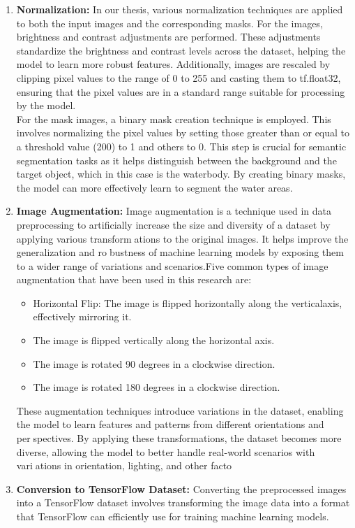 \begin{enumerate}
  
  
  \item \textbf{Normalization: }In our thesis, various normalization techniques are applied to both the input images and the corresponding masks. For the images, brightness and contrast adjustments are performed. These adjustments standardize the brightness and contrast levels across the dataset, helping the model to learn more robust features. Additionally, images are rescaled by clipping pixel values to the range of 0 to 255 and casting them to tf.float32, ensuring that the pixel values are in a standard range suitable for processing by the model.\\
  For the mask images, a binary mask creation technique is employed. This involves normalizing the pixel values by setting those greater than or equal to a threshold value (200) to 1 and others to 0. This step is crucial for semantic segmentation tasks as it helps distinguish between the background and the target object, which in this case is the waterbody. By creating binary masks, the model can more effectively learn to segment the water areas.
  
  \item \textbf{Image Augmentation: }Image augmentation is a technique used in data preprocessing to artificially
increase the size and diversity of a dataset by applying various transformations to the original images. It helps improve the generalization and robustness of machine learning models by exposing them to a wider range of
variations and scenarios.Five common types of image augmentation that
have been used in this research are:
 \begin{itemize}
     \item Horizontal Flip: The image is flipped horizontally along the verticalaxis, effectively mirroring it.
     \item The image is flipped vertically along the horizontal axis.
     \item The image is rotated 90 degrees in a clockwise
direction.
\item The image is rotated 180 degrees in a clockwise
direction.

 \end{itemize}
 These augmentation techniques introduce variations in the dataset, enabling
the model to learn features and patterns from different orientations and perspectives. By applying these transformations, the dataset becomes more
diverse, allowing the model to better handle real-world scenarios with variations in orientation, lighting, and other facto
\item \textbf{Conversion to TensorFlow Dataset: }Converting the preprocessed images into a TensorFlow dataset involves transforming the image data into a format that TensorFlow can efficiently use for training machine learning models. 

\end{enumerate} 








